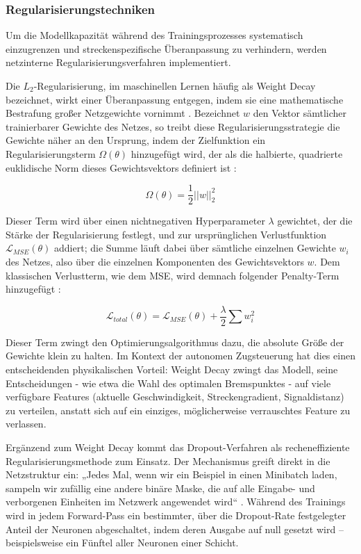 \subsubsection{Regularisierungstechniken}

Um die Modellkapazität während des Trainingsprozesses systematisch einzugrenzen und streckenspezifische Überanpassung zu verhindern, werden netzinterne Regularisierungsverfahren implementiert.

Die $L_2$-Regularisierung, im maschinellen Lernen häufig als Weight Decay bezeichnet, wirkt einer Überanpassung entgegen, indem sie eine mathematische Bestrafung großer Netzgewichte vornimmt \cite[vgl.][S.~230f.]{chap2_Goo16}. Bezeichnet $w$ den Vektor sämtlicher trainierbarer Gewichte des Netzes, so treibt diese Regularisierungsstrategie die Gewichte näher an den Ursprung, indem der Zielfunktion ein Regularisierungsterm $\Omega(\theta)$ hinzugefügt wird, der als die halbierte, quadrierte euklidische Norm dieses Gewichtsvektors definiert ist \cite[vgl.~S.~230]{chap2_Goo16}:

\begin{equation} \label{eq:omega}
\Omega(\theta) = \frac{1}{2} ||w||_2^2
\end{equation}

Dieser Term wird über einen nichtnegativen Hyperparameter $\lambda$ gewichtet, der die Stärke der Regularisierung festlegt, und zur ursprünglichen Verlustfunktion $\mathcal{L}_{MSE}(\theta)$ addiert; die Summe läuft dabei über sämtliche einzelnen Gewichte $w_i$ des Netzes, also über die einzelnen Komponenten des Gewichtsvektors $w$. Dem klassischen Verlustterm, wie dem \gls{MSE}, wird demnach folgender Penalty-Term hinzugefügt \cite[vgl.~S.~10]{chap2_Bis06}:

\begin{equation} \label{eq:L2}
\mathcal{L}_{total}(\theta) = \mathcal{L}_{MSE}(\theta) + \frac{\lambda}{2} \sum w_i^2
\end{equation}

Dieser Term zwingt den Optimierungsalgorithmus dazu, die absolute Größe der Gewichte klein zu halten. 
Im Kontext der autonomen Zugsteuerung hat dies einen entscheidenden physikalischen Vorteil: 
Weight Decay zwingt das Modell, seine Entscheidungen - wie etwa die Wahl des optimalen Bremspunktes - auf viele verfügbare Features (aktuelle Geschwindigkeit, Streckengradient, Signaldistanz) zu verteilen, anstatt sich auf ein einziges, möglicherweise verrauschtes Feature zu verlassen. 

Ergänzend zum Weight Decay kommt das Dropout-Verfahren als recheneffiziente Regularisierungsmethode zum Einsatz. 
Der Mechanismus greift direkt in die Netzstruktur ein: „Jedes Mal, wenn wir ein Beispiel in einen Minibatch laden, sampeln wir zufällig eine andere binäre Maske, die auf alle Eingabe- und verborgenen Einheiten im Netzwerk angewendet wird“ \cite[S.~258]{chap2_Goo16}. 
Während des Trainings wird in jedem Forward-Pass ein bestimmter, über die Dropout-Rate festgelegter Anteil der Neuronen abgeschaltet, indem deren Ausgabe auf null gesetzt wird -- beispielsweise ein Fünftel aller Neuronen einer Schicht.

